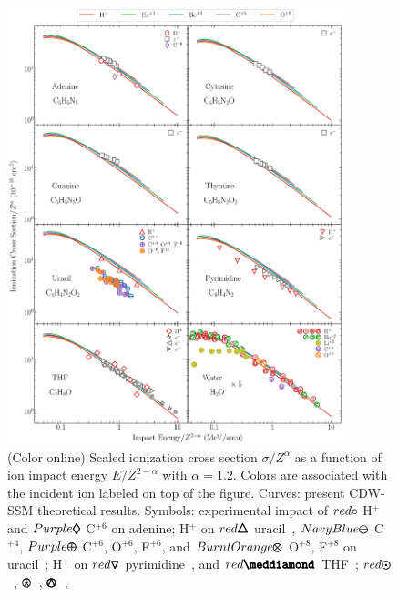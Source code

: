 \documentclass[10pt,showpacs,showkeys,twocolumn]{revtex4-1}
\begin{document}
\begin{figure}[!htb]
\centering
\includegraphics[width=0.87\textwidth]{zscale_alpha.eps}
\caption{(Color online) Scaled ionization cross section $\sigma/Z^{\alpha}$ 
as a function of ion impact energy $E/Z^{2-\alpha}$ with $\alpha=1.2$. 
Colors are associated with the incident ion labeled on top of the figure. 
Curves: present CDW-SSM theoretical results. Symbols: experimental 
impact of \mbox{\LARGE$\color{red}\circ$} H$^+$~\cite{iriki2011} and
{\fontsize{11}{20}$\color{Purple}\pmb{\lozenge}$} C$^{+6}$ 
\cite{tribedi2019} on adenine;
H$^+$ on {\fontsize{11}{20}$\color{red}\pmb{\triangle}$} uracil~\cite{itoh2013}, 
{\fontsize{11}{20}$\color{NavyBlue}\pmb{\ominus}$} C$^{+4}$, 
{\fontsize{11}{20}$\color{Purple}\pmb{\oplus}$} C$^{+6}$, O$^{+6}$, F$^{+6}$, and 
{\fontsize{11}{20}$\color{BurntOrange}\pmb{\otimes}$} O$^{+8}$, 
F$^{+8}$ on uracil~\cite{agnihotri2012,agnihotri2013};
H$^+$ on {\fontsize{11}{20}$\color{red}\pmb{\triangledown}$} 
pyrimidine~\cite{wolff2014}, and 
{\fontsize{10}{20}$\color{red}\pmb{\meddiamond}$} THF~\cite{wang2016};
\mbox{\fontsize{11}{20}$\color{red}\pmb{\odot}$}~\cite{Luna2007}, 
{\fontsize{11}{20}\color{red}$\pmb{\logof}$}~\cite{Rudd86}, 
{\fontsize{11}{20}\color{red}$\pmb{\varowedge}$}~\cite{pRudd85}, 
}
\end{figure}
\end{document}
